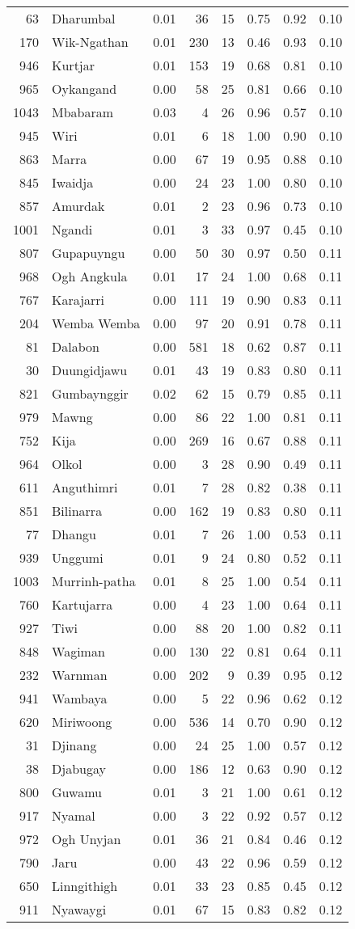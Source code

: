 \begin{longtable}[]{@{}rlrrrrrr@{}}
63 & Dharumbal & 0.01 & 36 & 15 & 0.75 & 0.92 & 0.10\tabularnewline
170 & Wik-Ngathan & 0.01 & 230 & 13 & 0.46 & 0.93 & 0.10\tabularnewline
946 & Kurtjar & 0.01 & 153 & 19 & 0.68 & 0.81 & 0.10\tabularnewline
965 & Oykangand & 0.00 & 58 & 25 & 0.81 & 0.66 & 0.10\tabularnewline
1043 & Mbabaram & 0.03 & 4 & 26 & 0.96 & 0.57 & 0.10\tabularnewline
945 & Wiri & 0.01 & 6 & 18 & 1.00 & 0.90 & 0.10\tabularnewline
863 & Marra & 0.00 & 67 & 19 & 0.95 & 0.88 & 0.10\tabularnewline
845 & Iwaidja & 0.00 & 24 & 23 & 1.00 & 0.80 & 0.10\tabularnewline
857 & Amurdak & 0.01 & 2 & 23 & 0.96 & 0.73 & 0.10\tabularnewline
1001 & Ngandi & 0.01 & 3 & 33 & 0.97 & 0.45 & 0.10\tabularnewline
807 & Gupapuyngu & 0.00 & 50 & 30 & 0.97 & 0.50 & 0.11\tabularnewline
968 & Ogh Angkula & 0.01 & 17 & 24 & 1.00 & 0.68 & 0.11\tabularnewline
767 & Karajarri & 0.00 & 111 & 19 & 0.90 & 0.83 & 0.11\tabularnewline
204 & Wemba Wemba & 0.00 & 97 & 20 & 0.91 & 0.78 & 0.11\tabularnewline
81 & Dalabon & 0.00 & 581 & 18 & 0.62 & 0.87 & 0.11\tabularnewline
30 & Duungidjawu & 0.01 & 43 & 19 & 0.83 & 0.80 & 0.11\tabularnewline
821 & Gumbaynggir & 0.02 & 62 & 15 & 0.79 & 0.85 & 0.11\tabularnewline
979 & Mawng & 0.00 & 86 & 22 & 1.00 & 0.81 & 0.11\tabularnewline
752 & Kija & 0.00 & 269 & 16 & 0.67 & 0.88 & 0.11\tabularnewline
964 & Olkol & 0.00 & 3 & 28 & 0.90 & 0.49 & 0.11\tabularnewline
611 & Anguthimri & 0.01 & 7 & 28 & 0.82 & 0.38 & 0.11\tabularnewline
851 & Bilinarra & 0.00 & 162 & 19 & 0.83 & 0.80 & 0.11\tabularnewline
77 & Dhangu & 0.01 & 7 & 26 & 1.00 & 0.53 & 0.11\tabularnewline
939 & Unggumi & 0.01 & 9 & 24 & 0.80 & 0.52 & 0.11\tabularnewline
1003 & Murrinh-patha & 0.01 & 8 & 25 & 1.00 & 0.54 & 0.11\tabularnewline
760 & Kartujarra & 0.00 & 4 & 23 & 1.00 & 0.64 & 0.11\tabularnewline
927 & Tiwi & 0.00 & 88 & 20 & 1.00 & 0.82 & 0.11\tabularnewline
848 & Wagiman & 0.00 & 130 & 22 & 0.81 & 0.64 & 0.11\tabularnewline
232 & Warnman & 0.00 & 202 & 9 & 0.39 & 0.95 & 0.12\tabularnewline
941 & Wambaya & 0.00 & 5 & 22 & 0.96 & 0.62 & 0.12\tabularnewline
620 & Miriwoong & 0.00 & 536 & 14 & 0.70 & 0.90 & 0.12\tabularnewline
31 & Djinang & 0.00 & 24 & 25 & 1.00 & 0.57 & 0.12\tabularnewline
38 & Djabugay & 0.00 & 186 & 12 & 0.63 & 0.90 & 0.12\tabularnewline
800 & Guwamu & 0.01 & 3 & 21 & 1.00 & 0.61 & 0.12\tabularnewline
917 & Nyamal & 0.00 & 3 & 22 & 0.92 & 0.57 & 0.12\tabularnewline
972 & Ogh Unyjan & 0.01 & 36 & 21 & 0.84 & 0.46 & 0.12\tabularnewline
790 & Jaru & 0.00 & 43 & 22 & 0.96 & 0.59 & 0.12\tabularnewline
650 & Linngithigh & 0.01 & 33 & 23 & 0.85 & 0.45 & 0.12\tabularnewline
911 & Nyawaygi & 0.01 & 67 & 15 & 0.83 & 0.82 & 0.12\tabularnewline

\end{longtable}
